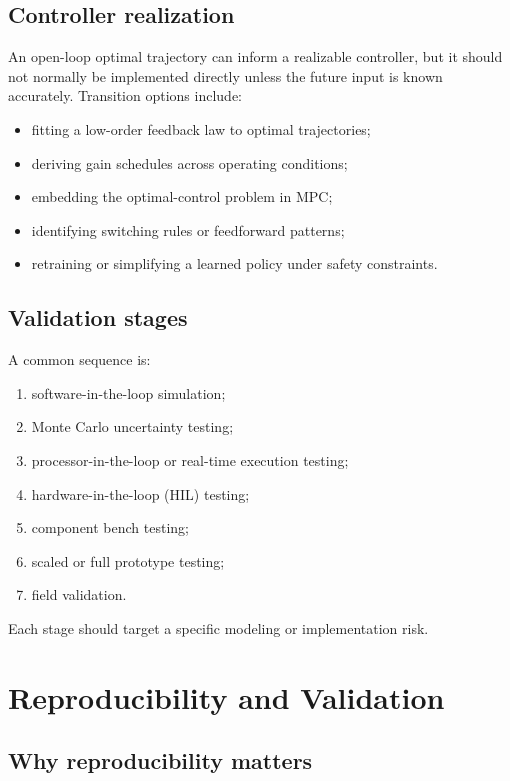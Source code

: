 \documentclass[11pt]{article}
\begin{document}
\subsection{Controller realization}

An open-loop optimal trajectory can inform a realizable controller, but it should not normally be implemented directly unless the future input is known accurately. Transition options include:
\begin{itemize}[leftmargin=1.4em]
  \item fitting a low-order feedback law to optimal trajectories;
  \item deriving gain schedules across operating conditions;
  \item embedding the optimal-control problem in MPC;
  \item identifying switching rules or feedforward patterns;
  \item retraining or simplifying a learned policy under safety constraints.
\end{itemize}

\subsection{Validation stages}

A common sequence is:
\begin{enumerate}[leftmargin=1.5em]
  \item software-in-the-loop simulation;
  \item Monte Carlo uncertainty testing;
  \item processor-in-the-loop or real-time execution testing;
  \item hardware-in-the-loop (HIL) testing;
  \item component bench testing;
  \item scaled or full prototype testing;
  \item field validation.
\end{enumerate}

Each stage should target a specific modeling or implementation risk.

\section{Reproducibility and Validation}

\subsection{Why reproducibility matters}
\end{document}
